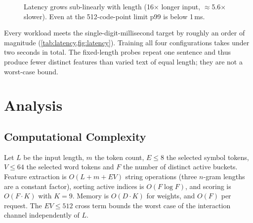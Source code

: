 \documentclass[11pt,a4paper]{article}
\theoremstyle{remark}
\begin{document}
\begin{figure}[h]
\centering
{}
\caption{Latency grows sub-linearly with length (16$\times$ longer input,
$\approx$5.6$\times$ slower). Even at the 512-code-point limit p99 is below 1\,ms.}
\label{fig:latency}
\end{figure}

Every workload meets the single-digit-millisecond target by roughly an order
of magnitude (\cref{tab:latency,fig:latency}). Training all four
configurations takes under two seconds in total. The fixed-length probes
repeat one sentence and thus produce fewer distinct features than varied text
of equal length; they are not a worst-case bound.

\section{Analysis}
\label{sec:analysis}

\subsection{Computational Complexity}
Let $L$ be the input length, $m$ the token count, $E\le8$ the selected symbol
tokens, $V\le64$ the selected word tokens and $F$ the number of distinct active
buckets. Feature extraction is $O(L+m+EV)$ string operations (three $n$-gram
lengths are a constant factor), sorting active indices is $O(F\log F)$, and
scoring is $O(F\cdot K)$ with $K=9$. Memory is $O(D\cdot K)$ for weights, and
$O(F)$ per request. The $EV\le512$ cross term bounds the worst case of the
interaction channel independently of $L$.
\end{document}
